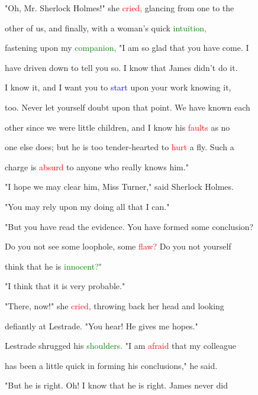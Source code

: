  "Oh, Mr. Sherlock Holmes!" she \textcolor{red}{cried,} glancing from one to the

 other of us, and \textcolor{BurntOrange}{finally,} with a woman's quick \textcolor{green}{intuition,}

 fastening upon my \textcolor{green}{companion,} "I am so \textcolor{BurntOrange}{glad} that you have come. I

 have driven down to tell you so. I know that James didn't do it.

 I know it, and I want you to \textcolor{blue}{start} upon your work knowing it,

 too. Never let yourself \textcolor{BurntOrange}{doubt} upon that point. We have known each

 other since we were little \textcolor{BurntOrange}{children,} and I know his \textcolor{red}{faults} as no

 one else does; but he is too tender-hearted to \textcolor{red}{hurt} a fly. Such a

 charge is \textcolor{red}{absurd} to anyone who really knows him."



 "I \textcolor{BurntOrange}{hope} we may clear him, Miss Turner," said Sherlock Holmes.

 "You may rely upon my doing all that I can."



 "But you have read the evidence. You have formed some conclusion?

 Do you not see some loophole, some \textcolor{red}{flaw?} Do you not yourself

 think that he is \textcolor{green}{innocent?"}



 "I think that it is very probable."



 "There, now!" she \textcolor{red}{cried,} throwing back her head and looking

 defiantly at Lestrade. "You hear! He gives me \textcolor{BurntOrange}{hopes."}



 Lestrade shrugged his \textcolor{green}{shoulders.} "I am \textcolor{red}{afraid} that my colleague

 has been a little quick in forming his conclusions," he said.



 "But he is right. Oh! I know that he is right. James never did

